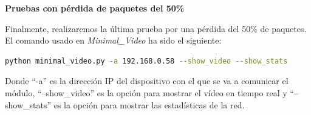 \newpage

\textbf{Pruebas con pérdida de paquetes del 50\%}
\vspace{\baselineskip}

Finalmente, realizaremos la última prueba por una pérdida del 50\% de paquetes. El comando usado en \textit{Minimal\_Video} ha sido el siguiente:

\begin{lstlisting}[language=bash]
python minimal_video.py -a 192.168.0.58 --show_video --show_stats
\end{lstlisting}
Donde ``-a'' es la dirección IP del dispositivo con el que se va a comunicar el módulo, ``--show\_video'' es la opción para mostrar el vídeo en tiempo real y ``--show\_stats'' es la opción para mostrar las estadísticas de la red.
\vspace{\baselineskip}

